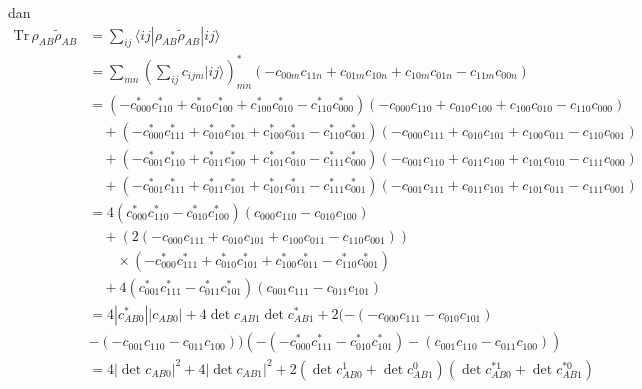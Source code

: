 dan
\begin{equation}
	\begin{aligned}
		\mathrm{Tr}\,\rho_{AB} \tilde{\rho}_{AB}
		&= \sum_{i j}
		\langle i j |
		\rho_{AB} \tilde{\rho}_{AB}
		| i j \rangle \\
		&= \sum_{m n}
		\left(
		\sum_{i j} c_{i j m} | i j \rangle
		\right)^{*}_{mn}
		\left(
		- c_{00m} c_{11n}
		+ c_{01m} c_{10n}
		+ c_{10m} c_{01n}
		- c_{11m} c_{00n}
		\right) \\
		&= (-c^{*}_{000} c^{*}_{110}
		+ c^{*}_{010} c^{*}_{100}
		+ c^{*}_{100} c^{*}_{010}
		- c^{*}_{110} c^{*}_{000})
		(-c_{000} c_{110}
		+ c_{010} c_{100}
		+ c_{100} c_{010}
		- c_{110} c_{000}) \\
		&\quad + (-c^{*}_{000} c^{*}_{111}
		+ c^{*}_{010} c^{*}_{101}
		+ c^{*}_{100} c^{*}_{011}
		- c^{*}_{110} c^{*}_{001})
		(-c_{000} c_{111}
		+ c_{010} c_{101}
		+ c_{100} c_{011}
		- c_{110} c_{001}) \\
		&\quad + (-c^{*}_{001} c^{*}_{110}
		+ c^{*}_{011} c^{*}_{100}
		+ c^{*}_{101} c^{*}_{010}
		- c^{*}_{111} c^{*}_{000})
		(-c_{001} c_{110}
		+ c_{011} c_{100}
		+ c_{101} c_{010}
		- c_{111} c_{000}) \\
		&\quad + (-c^{*}_{001} c^{*}_{111}
		+ c^{*}_{011} c^{*}_{101}
		+ c^{*}_{101} c^{*}_{011}
		- c^{*}_{111} c^{*}_{001})
		(-c_{001} c_{111}
		+ c_{011} c_{101}
		+ c_{101} c_{011}
		- c_{111} c_{001})\\
		&= 4 (c^{*}_{000} c^{*}_{110}
		- c^{*}_{010} c^{*}_{100})
		(c_{000} c_{110}
		- c_{010} c_{100}) \\
		&\quad + (2 (-c_{000} c_{111}
		+ c_{010} c_{101}
		+ c_{100} c_{011}
		- c_{110} c_{001})) \\
		&\qquad \times
		(-c^{*}_{000} c^{*}_{111}
		+ c^{*}_{010} c^{*}_{101}
		+ c^{*}_{100} c^{*}_{011}
		- c^{*}_{110} c^{*}_{001}) \\
		&\quad + 4 (c^{*}_{001} c^{*}_{111}
		- c^{*}_{011} c^{*}_{101})
		(c_{001} c_{111}
		- c_{011} c_{101})\\
		&= 4 |c_{AB0}^{*}| |c_{AB0}|+ 4 \det c_{AB1} \det c_{AB1}^{*}+2(-(-c_{000}c_{111}-c_{010}c_{101})\\
		&-(-c_{001}c_{110}-c_{011}c_{100}))(-(-c^{*}_{000} c^{*}_{111}-c^{*}_{010} c^{*}_{101})-(c_{001}c_{110}-c_{011}c_{100}))\\
		&= 4 |\det c_{AB0}|^2
		+ 4 |\det c_{AB1}|^2
		+ 2 (\det c_{AB0}^1 + \det c_{AB1}^0)(\det c^{*1}_{AB0} + \det c^{*0}_{AB1})
	\end{aligned}
\end{equation}

